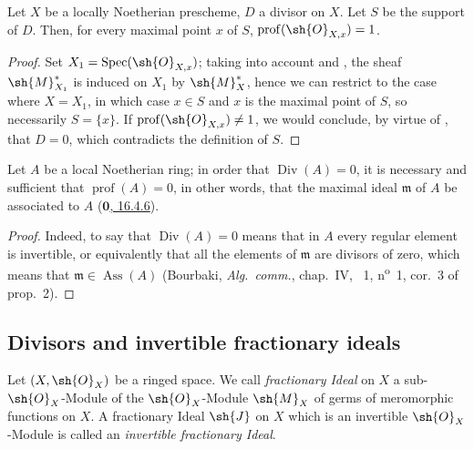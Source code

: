 \begin{corollary}[21.1.9]
\label{IV.21.1.9}
Let $X$ be a locally Noetherian prescheme, $D$ a divisor on $X$.
Let $S$ be the support of $D$.
Then, for every maximal point $x$ of $S$, $\operatorname{prof}(\sh{O}_{X,x})=1$.
\end{corollary}

\begin{proof}
Set $X_1=\operatorname{Spec}(\sh{O}_{X,x})$;
taking into account  and , the sheaf $\sh{M}_{X_1}^*$ is induced on $X_1$ by $\sh{M}_X^*$, hence we can restrict to the case where $X=X_1$, in which case $x\in S$ and $x$ is the maximal point of $S$, so necessarily $S=\{x\}$.
If $\operatorname{prof}(\sh{O}_{X,x})\neq 1$, we would conclude, by virtue of , that $D=0$, which contradicts the definition of $S$.
\end{proof}

\begin{proposition}[21.1.10]
\label{IV.21.1.10}
Let $A$ be a local Noetherian ring;
in order that $\operatorname{Div}(A)=0$, it is necessary and sufficient that $\operatorname{prof}(A)=0$, in other words, that the maximal ideal $\mathfrak{m}$ of $A$ be associated to $A$
(\hyperref[0.16.4.6]{$\mathbf{0}$, 16.4.6}).
\end{proposition}

\begin{proof}
Indeed, to say that $\operatorname{Div}(A)=0$ means that in $A$ every regular element is invertible, or equivalently that all the elements of $\mathfrak{m}$ are divisors of zero, which means that $\mathfrak{m}\in\operatorname{Ass}(A)$ (Bourbaki, \emph{Alg.\ comm.}, chap.~IV, \textsection~1, n\textsuperscript{o}~1, cor.~3 of prop.~2).
\end{proof}

\subsection{Divisors and invertible fractionary ideals}
\label{subsection:IV.21.2}

\begin{env}[21.2.1]
\label{IV.21.2.1}
Let $(X,\sh{O}_X)$ be a ringed space.
We call \emph{fractionary Ideal} on $X$ a sub-$\sh{O}_X$-Module of the $\sh{O}_X$-Module $\sh{M}_X$ of germs of meromorphic functions on $X$.
A fractionary Ideal $\sh{J}$ on $X$ which is an invertible $\sh{O}_X$-Module is called an \emph{invertible fractionary Ideal}.
\end{env}

